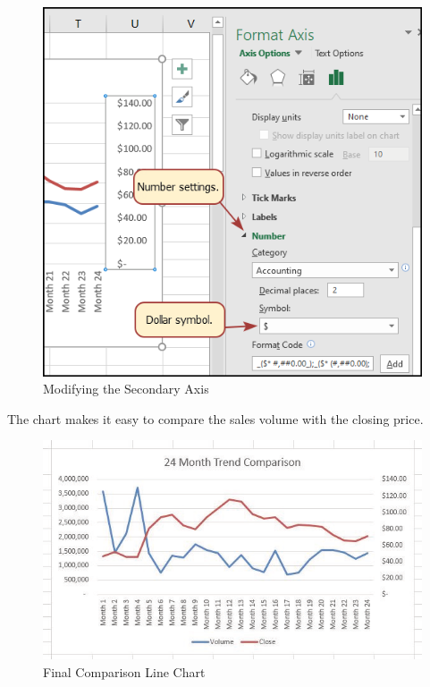 \begin{figure}[H]
	\centering
	\includegraphics[width=\maxwidth{.75\linewidth}]{gfx/ch04_fig09}
	\caption{Modifying the Secondary Axis}
	\label{04:fig09}
\end{figure}

The chart makes it easy to compare the sales volume with the closing price.

\begin{figure}[H]
	\centering
	\includegraphics[width=\maxwidth{.95\linewidth}]{gfx/ch04_fig10}
	\caption{Final Comparison Line Chart}
	\label{04:fig10}
\end{figure}


